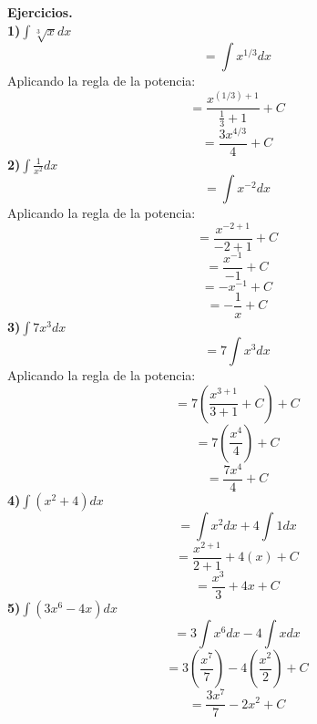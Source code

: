 \documentclass[11pt]{report}
\begin{document}
\pagebreak \textbf{Ejercicios.}\\[2mm]
\textbf{1)}$\displaystyle \int \sqrt[3]{x}dx$
$$=\int x^{1/3}dx$$
Aplicando la regla de la potencia:
$$=\frac{x^{(1/3)+1}}{\frac{1}{3}+1}+C$$
$$=\frac{3x^{4/3}}{4}+C$$
\textbf{2)}$\displaystyle \int \frac{1}{x^2}dx$
$$=\int x^{-2}dx$$
Aplicando la regla de la potencia:
$$=\frac{x^{-2+1}}{-2+1}+C$$
$$=\frac{x^{-1}}{-1}+C$$
$$=-x^{-1}+C$$
$$=-\frac{1}{x}+C$$
\textbf{3)}$\displaystyle \int 7x^3dx$
$$=7\int x^3 dx$$
Aplicando la regla de la potencia:
$$=7 \left( \frac{x^{3+1}}{3+1}+C \right)+C$$
$$=7 \left( \frac{x^4}{4} \right)+C$$
$$=\frac{7x^4}{4}+C$$
\textbf{4)}$\displaystyle \int (x^2+4)dx$
$$=\int x^2dx+4\int 1dx$$
$$=\frac{x^{2+1}}{2+1}+4(x)+C$$
$$=\frac{x^3}{3}+4x+C$$
\textbf{5)}$\displaystyle \int (3x^6-4x)dx$
$$=3\int x^6dx - 4 \int x dx$$
$$=3\left( \frac{x^7}{7}\right) -4\left( \frac{x^2}{2}\right) +C$$
$$=\frac{3x^7}{7}-2x^2+C$$
\end{document}
